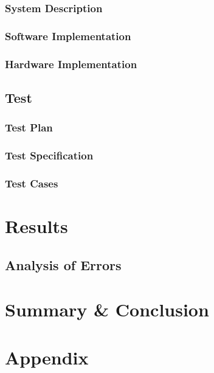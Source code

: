 \documentclass{article}
\begin{document}
\subsubsection{System Description}
\subsubsection{Software Implementation}
\subsubsection{Hardware Implementation}

\subsection{Test}
\subsubsection{Test Plan}
\subsubsection{Test Specification}
\subsubsection{Test Cases}


\section{Results}
\subsection{Analysis of Errors}


\section{Summary \& Conclusion}


\section{Appendix}
\end{document}
